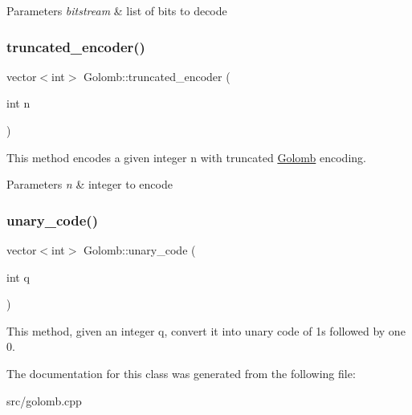 \begin{DoxyParams}{Parameters}
{\em bitstream} & list of bits to decode \\
\hline
\end{DoxyParams}
\mbox{\label{classGolomb_a2a12ea7e114395b3c20268a68ede3e29}} 
\subsubsection{\texorpdfstring{truncated\+\_\+encoder()}{truncated\_encoder()}}
{\footnotesize\ttfamily vector$<$int$>$ Golomb\+::truncated\+\_\+encoder (\begin{DoxyParamCaption}\item[{int}]{n }\end{DoxyParamCaption})\hspace{0.3cm}{\ttfamily [inline]}}

This method encodes a given integer \textquotesingle{}n\textquotesingle{} with truncated \hyperlink{classGolomb}{Golomb} encoding.


\begin{DoxyParams}{Parameters}
{\em n} & integer to encode \\
\hline
\end{DoxyParams}
\mbox{\label{classGolomb_aa5f4148a661789fb5035a4ed7e1aa133}} 
\subsubsection{\texorpdfstring{unary\+\_\+code()}{unary\_code()}}
{\footnotesize\ttfamily vector$<$int$>$ Golomb\+::unary\+\_\+code (\begin{DoxyParamCaption}\item[{int}]{q }\end{DoxyParamCaption})\hspace{0.3cm}{\ttfamily [inline]}}

This method, given an integer \textquotesingle{}q\textquotesingle{}, convert it into unary code of 1\textquotesingle{}s followed by one 0. 

The documentation for this class was generated from the following file\+:\begin{DoxyCompactItemize}
\item 
src/golomb.\+cpp\end{DoxyCompactItemize}
